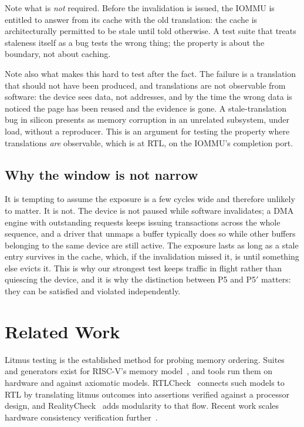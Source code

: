 \documentclass[journal]{IEEEtran}
\begin{document}
Note what is \emph{not} required. Before the invalidation is issued, the IOMMU
is entitled to answer from its cache with the old translation: the cache is
architecturally permitted to be stale until told otherwise. A test suite that
treats staleness itself as a bug tests the wrong thing; the property is about
the boundary, not about caching.

Note also what makes this hard to test after the fact. The failure is a
translation that should not have been produced, and translations are not
observable from software: the device sees data, not addresses, and by the time
the wrong data is noticed the page has been reused and the evidence is gone. A
stale-translation bug in silicon presents as memory corruption in an unrelated
subsystem, under load, without a reproducer. This is an argument for testing the
property where translations \emph{are} observable, which is at RTL, on the
IOMMU's completion port.

\subsection{Why the window is not narrow}
It is tempting to assume the exposure is a few cycles wide and therefore
unlikely to matter. It is not. The device is not paused while software
invalidates; a DMA engine with outstanding requests keeps issuing transactions
across the whole sequence, and a driver that unmaps a buffer typically does so
while other buffers belonging to the same device are still active. The exposure
lasts as long as a stale entry survives in the cache, which, if the invalidation
missed it, is until something else evicts it. This is why our strongest test
keeps traffic in flight rather than quiescing the device, and it is why the
distinction between P5 and P5$'$ matters: they can be satisfied and violated
independently.

\section{Related Work}
Litmus testing is the established method for probing memory ordering. Suites and
generators exist for RISC-V's memory model~\cite{litmusriscv}, and tools run
them on hardware and against axiomatic models. RTLCheck~\cite{rtlcheck} connects
such models to RTL by translating litmus outcomes into assertions verified
against a processor design, and RealityCheck~\cite{realitycheck} adds modularity
to that flow. Recent work scales hardware consistency
verification further~\cite{qed}.
\end{document}
